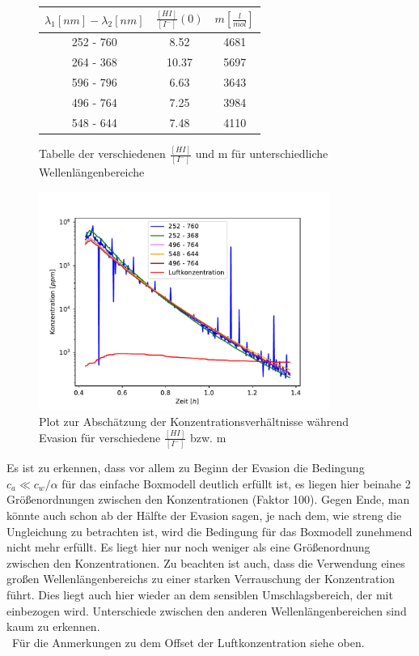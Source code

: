 \documentclass[12pt]{article}
\begin{document}
\begin{figure}[H]
	\centering
	\parbox{57.5mm}{
		\centering
		\begin{tabular}{c|c|c}
			$\lambda_1 [nm] - \lambda_2 [nm]$ & $\frac{[HI]}{[I^-]}(0)$ & $m [\frac{l}{mol}]$ \\ \hline
			252 - 760 & 8.52 & 4681 \\
			264 - 368 & 10.37 & 5697 \\
			596 - 796 & 6.63 & 3643 \\
			496 - 764 & 7.25 & 3984 \\
			548 - 644 & 7.48 & 4110
		\end{tabular}
		\caption{Tabelle der verschiedenen $\frac{[HI]}{[I^-]}$ und m für unterschiedliche Wellenlängenbereiche}
	}
	\hfill%
	\parbox{95mm}{
		\centering
		\includegraphics[width=95mm]{Meerwasser/Indikator.pdf}
		\caption{Plot zur Abschätzung der Konzentrationsverhältnisse während Evasion für verschiedene $\frac{[HI]}{[I^-]}$ bzw. m}
	}
\end{figure}

Es ist zu erkennen, dass vor allem zu Beginn der Evasion die Bedingung $c_a \ll c_w/\alpha $ für das einfache Boxmodell deutlich erfüllt ist, es liegen hier beinahe 2 Größenordnungen zwischen den Konzentrationen (Faktor 100). Gegen Ende, man könnte auch schon ab der Hälfte der Evasion sagen, je nach dem, wie streng die Ungleichung zu betrachten ist, wird die Bedingung für das Boxmodell zunehmend nicht mehr erfüllt. Es liegt hier nur noch weniger als eine Größenordnung zwischen den Konzentrationen. Zu beachten ist auch, dass die Verwendung eines großen Wellenlängenbereichs zu einer starken Verrauschung der Konzentration führt. Dies liegt auch hier wieder an dem sensiblen Umschlagsbereich, der mit einbezogen wird. Unterschiede zwischen den anderen Wellenlängenbereichen sind kaum zu erkennen.\\\
Für die Anmerkungen zu dem Offset der Luftkonzentration siehe oben.
\end{document}
